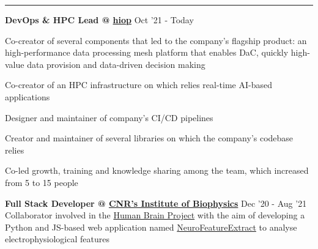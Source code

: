\documentclass[11pt,letterpaper]{article}
\begin{document}
\begin{justify}
      \hrule
      \begin{itemize}[label={}, leftmargin=0pt]
            \begin{item}
                  \textbf{DevOps \& HPC Lead @ \href{https://hiop.io/}{hiop}}
                  \hfill
                  Oct '21 - Today
                  \vspace{-0.15cm}
                  \begin{itemize}[label={$\bullet$}, leftmargin=12.5pt, noitemsep]
                        \begin{item}
                              Co-creator of several components that led to the company's flagship product: an high-performance data processing mesh platform that enables DaC, quickly high-value data provision and data-driven decision making
                        \end{item}
                        \begin{item}
                              Co-creator of an HPC infrastructure on which relies real-time AI-based applications
                        \end{item}
                        \begin{item}
                              Designer and maintainer of company's CI/CD pipelines
                        \end{item}
                        \begin{item}
                              Creator and maintainer of several libraries on which the company's codebase relies
                        \end{item}
                        \begin{item}
                              Co-led growth, training and knowledge sharing among the team, which increased from 5 to 15 people
                        \end{item}
                  \end{itemize}
            \end{item}
            \begin{item}
                  \textbf{Full Stack Developer @ \href{https://www.ibf.cnr.it}{CNR’s Institute of Biophysics}}
                  \hfill
                  Dec '20 - Aug '21
                  \vspace{0.05cm}
                  \\
                  Collaborator involved in the \href{https://www.humanbrainproject.eu/en/}{Human Brain Project} with the aim of developing a Python and JS-based web application named \href{https://hhnb.ebrains-italy.eu/efelg/}{NeuroFeatureExtract} to analyse electrophysiological features

\end{item}
\end{itemize}
\end{justify}
\end{document}
